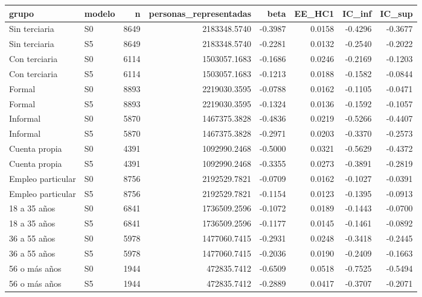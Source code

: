 \begin{tabular}{llrrrrrr}
\toprule
grupo & modelo & n & personas\_representadas & beta & EE\_HC1 & IC\_inf & IC\_sup \\
\midrule
Sin terciaria & S0 & 8649 & 2183348.5740 & -0.3987 & 0.0158 & -0.4296 & -0.3677 \\
Sin terciaria & S5 & 8649 & 2183348.5740 & -0.2281 & 0.0132 & -0.2540 & -0.2022 \\
Con terciaria & S0 & 6114 & 1503057.1683 & -0.1686 & 0.0246 & -0.2169 & -0.1203 \\
Con terciaria & S5 & 6114 & 1503057.1683 & -0.1213 & 0.0188 & -0.1582 & -0.0844 \\
Formal & S0 & 8893 & 2219030.3595 & -0.0788 & 0.0162 & -0.1105 & -0.0471 \\
Formal & S5 & 8893 & 2219030.3595 & -0.1324 & 0.0136 & -0.1592 & -0.1057 \\
Informal & S0 & 5870 & 1467375.3828 & -0.4836 & 0.0219 & -0.5266 & -0.4407 \\
Informal & S5 & 5870 & 1467375.3828 & -0.2971 & 0.0203 & -0.3370 & -0.2573 \\
Cuenta propia & S0 & 4391 & 1092990.2468 & -0.5000 & 0.0321 & -0.5629 & -0.4372 \\
Cuenta propia & S5 & 4391 & 1092990.2468 & -0.3355 & 0.0273 & -0.3891 & -0.2819 \\
Empleo particular & S0 & 8756 & 2192529.7821 & -0.0709 & 0.0162 & -0.1027 & -0.0391 \\
Empleo particular & S5 & 8756 & 2192529.7821 & -0.1154 & 0.0123 & -0.1395 & -0.0913 \\
18 a 35 años & S0 & 6841 & 1736509.2596 & -0.1072 & 0.0189 & -0.1443 & -0.0700 \\
18 a 35 años & S5 & 6841 & 1736509.2596 & -0.1177 & 0.0145 & -0.1461 & -0.0892 \\
36 a 55 años & S0 & 5978 & 1477060.7415 & -0.2931 & 0.0248 & -0.3418 & -0.2445 \\
36 a 55 años & S5 & 5978 & 1477060.7415 & -0.2036 & 0.0190 & -0.2409 & -0.1663 \\
56 o más años & S0 & 1944 & 472835.7412 & -0.6509 & 0.0518 & -0.7525 & -0.5494 \\
56 o más años & S5 & 1944 & 472835.7412 & -0.2889 & 0.0417 & -0.3707 & -0.2071 \\
\bottomrule
\end{tabular}
